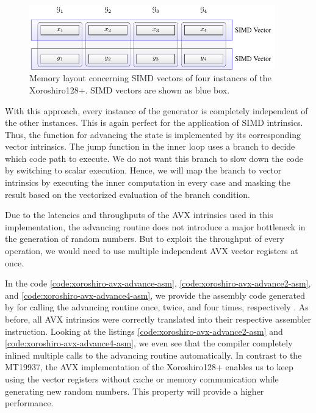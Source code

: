 \documentclass{stdlocal}
\begin{document}
    \begin{figure}
      \center
      \includegraphics[width=0.95\textwidth]{figures/xrsr128p_vector_layout.pdf}
      \caption[Xoroshiro128+ Vector Layout]{%
        Memory layout concerning SIMD vectors of four instances of the Xoroshiro128+.
        SIMD vectors are shown as blue box.
      }
      \label{fig:xoroshiro-vector-layout}
    \end{figure}

    With this approach, every instance of the generator is completely independent of the other instances.
    This is again perfect for the application of SIMD intrinsics.
    Thus, the function for advancing the state is implemented by its corresponding vector intrinsics.
    The jump function in the inner loop uses a branch to decide which code path to execute.
    We do not want this branch to slow down the code by switching to scalar execution.
    Hence, we will map the branch to vector intrinsics by executing the inner computation in every case and masking the result based on the vectorized evaluation of the branch condition.

    Due to the latencies and throughputs of the AVX intrinsics used in this implementation, the advancing routine does not introduce a major bottleneck in the generation of random numbers.
    But to exploit the throughput of every operation, we would need to use multiple independent AVX vector registers at once.

    In the code \ref{code:xoroshiro-avx-advance-asm}, \ref{code:xoroshiro-avx-advance2-asm}, and \ref{code:xoroshiro-avx-advance4-asm}, we provide the assembly code generated by  for calling the advancing routine once, twice, and four times, respectively \autocite{compiler-explorer}.
    As before, all AVX intrinsics were correctly translated into their respective assembler instruction.
    Looking at the listings \ref{code:xoroshiro-avx-advance2-asm} and \ref{code:xoroshiro-avx-advance4-asm}, we even see that the compiler completely inlined multiple calls to the advancing routine automatically.
    In contrast to the MT19937, the AVX implementation of the Xoroshiro128+ enables us to keep using the vector registers without cache or memory communication while generating new random numbers.
    This property will provide a higher performance.
\end{document}
